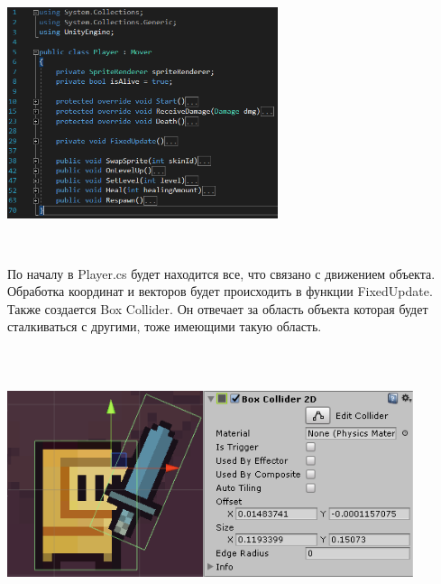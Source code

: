 \documentclass[a4paper,12pt]{article}
\begin{document}
\centerline{\includegraphics[width = 300px, height=300px]{pictures/player1.png}}

По началу в Player.cs будет находится все, что связано с движением объекта. Обработка координат и векторов будет происходить в функции FixedUpdate. Также создается Box Collider. Он отвечает за область объекта которая будет сталкиваться с другими, тоже имеющими такую область. \\ 
\centerline{\includegraphics[width = 450px, height=300px]{pictures/boxcoll.png}}
\end{document}
